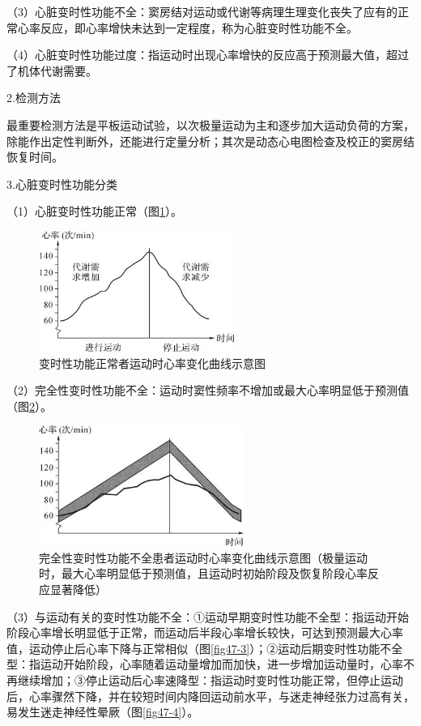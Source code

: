 （3）心脏变时性功能不全：窦房结对运动或代谢等病理生理变化丧失了应有的正常心率反应，即心率增快未达到一定程度，称为心脏变时性功能不全。

（4）心脏变时性功能过度：指运动时出现心率增快的反应高于预测最大值，超过了机体代谢需要。

2.检测方法

最重要检测方法是平板运动试验，以次极量运动为主和逐步加大运动负荷的方案，除能作出定性判断外，还能进行定量分析；其次是动态心电图检查及校正的窦房结恢复时间。

3.心脏变时性功能分类

（1）心脏变时性功能正常（图\ref{fig47-1}）。

\begin{figure}[!htbp]
 \centering
 \includegraphics[width=2.51042in,height=1.55208in]{./images/Image00738.jpg}
 \captionsetup{justification=centering}
 \caption{变时性功能正常者运动时心率变化曲线示意图}
 \label{fig47-1}
  \end{figure} 

（2）完全性变时性功能不全：运动时窦性频率不增加或最大心率明显低于预测值（图\ref{fig47-2}）。

\begin{figure}[!htbp]
 \centering
 \includegraphics[width=2.63542in,height=1.55208in]{./images/Image00739.jpg}
 \captionsetup{justification=centering}
 \caption{完全性变时性功能不全患者运动时心率变化曲线示意图（极量运动时，最大心率明显低于预测值，且运动时初始阶段及恢复阶段心率反应显著降低）}
 \label{fig47-2}
  \end{figure} 

（3）与运动有关的变时性功能不全：①运动早期变时性功能不全型：指运动开始阶段心率增长明显低于正常，而运动后半段心率增长较快，可达到预测最大心率值，运动停止后心率下降与正常相似（图\ref{fig47-3}）；②运动后期变时性功能不全型：指运动开始阶段，心率随着运动量增加而加快，进一步增加运动量时，心率不再继续增加；③停止运动后心率速降型：指运动时变时性功能正常，但停止运动后，心率骤然下降，并在较短时间内降回运动前水平，与迷走神经张力过高有关，易发生迷走神经性晕厥（图\ref{fig47-4}）。

